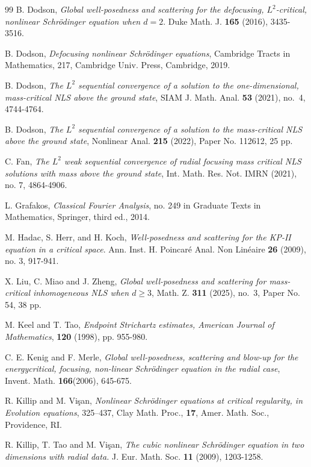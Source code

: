 \documentclass[reqno,11pt]{amsart}
\theoremstyle{plain}
\theoremstyle{definition}
\numberwithin{equation}{section}
\numberwithin{theorem}{section}
\def\ge{\geqslant}
\begin{document}
\begin{thebibliography}{99}
 B. Dodson, 
\emph{Global well-posedness and scattering for the defocusing, $L^2$-critical, nonlinear Schr\"odinger equation when $d=2$}. 
Duke Math. J. {\bf165} (2016), 3435-3516.

B. Dodson, \emph{Defocusing nonlinear Schr\"odinger equations}, Cambridge Tracts in Mathematics, 217, Cambridge Univ. Press, Cambridge, 2019.

 B. Dodson, \emph{The $L^2$ sequential convergence of a solution to the one-dimensional, mass-critical NLS above the ground state}, SIAM J. Math. Anal. {\bf 53} (2021), no.~4, 4744-4764.

B. Dodson, \emph{The $L^2 $ sequential convergence of a solution to the mass-critical NLS above the ground state}, Nonlinear Anal. {\bf 215} (2022), Paper No. 112612, 25 pp.



C. Fan, \emph{The $L^2$ weak sequential convergence of radial focusing mass critical NLS solutions with mass above the ground state},
Int. Math. Res. Not. IMRN (2021), no. 7, 4864-4906.

L. Grafakos, \emph{Classical Fourier Analysis}, no. 249 in Graduate Texts in Mathematics, Springer, third ed., 2014.


M. Hadac, S. Herr, and H. Koch,
 \emph{Well-posedness and scattering for the KP-II equation in a critical space}. Ann. Inst. H. Poincar\'e Anal. Non Lin\'eaire {\bf 26} (2009), no. 3,  917-941.

X. Liu, C. Miao and J. Zheng, \emph{Global well-posedness and scattering for mass-critical inhomogeneous NLS when $d\ge 3$}, Math. Z. {\bf 311} (2025), no.~3, Paper No. 54, 38 pp.

 M. Keel and T. Tao, \emph{Endpoint Strichartz estimates, American Journal of Mathematics}, {\bf 120} (1998), pp. 955-980.

 
C. E. Kenig and F. Merle, \emph{Global well-posedness, scattering and blow-up for the energycritical, focusing, non-linear Schr\"odinger equation in the radial case}, Invent. Math. {\bf166}(2006), 645-675.

R. Killip and M. Vi\c{s}an, \emph{Nonlinear Schr\"odinger equations at critical regularity, in  Evolution equations}, 325--437, Clay Math. Proc., {\bf17}, Amer. Math. Soc., Providence, RI.

R. Killip, T. Tao and M. Vi\c{s}an, 
\emph{The cubic nonlinear Schr\"odinger equation in two dimensions with radial data.} J. Eur. Math. Soc. {\bf11} (2009),  1203-1258.


\end{thebibliography}
\end{document}
